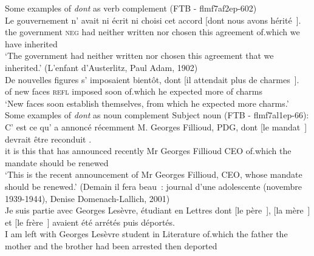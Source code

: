 \ea Some examples of \emph{dont} as verb complement\label{ex:dont-corpus-verb}
\ea (FTB - flmf7af2ep-602)\\
\gll Le gouvernement n' avait ni écrit ni choisi cet accord [dont nous avons hérité~\trace{}].\\
the government \textsc{neg} had neither written nor chosen this agreement of.which we have inherited\\
\glt `The government had neither written nor chosen this agreement that we inherited.'
\label{ex:FTB-verb}
\ex (L'enfant d'Austerlitz, Paul Adam, 1902)\\
\gll De nouvelles figures s' imposaient bientôt, dont [il attendait plus de charmes~\trace{}].\\
of new faces \textsc{refl} imposed soon of.which he expected more of charms\\
\glt `New faces soon establish themselves, from which he expected more charms.'
\label{ex:d1900-verb}
\z
\pagebreak
\ex Some examples of \emph{dont} as noun complement\label{ex:FTB-noun}
\ea Subject noun (FTB - flmf7al1ep-66):\\
\gll C' est ce qu' a annoncé récemment M. Georges Fillioud, PDG, dont [le mandat~\trace{}] devrait être reconduit .\\
it is this that has announced recently Mr Georges Fillioud CEO of.which the mandate should be renewed\\
\glt `This is the recent announcement of Mr Georges Fillioud, CEO, whose mandate should be renewed.'
\label{ex:FTB-subj}
\ex (Demain il fera beau~: journal d'une adolescente (novembre 1939-1944), Denise Domenach-Lallich, 2001)\\
\gll Je suis partie avec Georges Lesèvre, étudiant en Lettres dont [le père~\trace{}], [la mère~\trace{}] et [le frère~\trace{}] avaient été arrétés puis déportés.\\
I am left with Georges Lesèvre student in Literature of.which the father the mother and the brother had been arrested then deported\\
